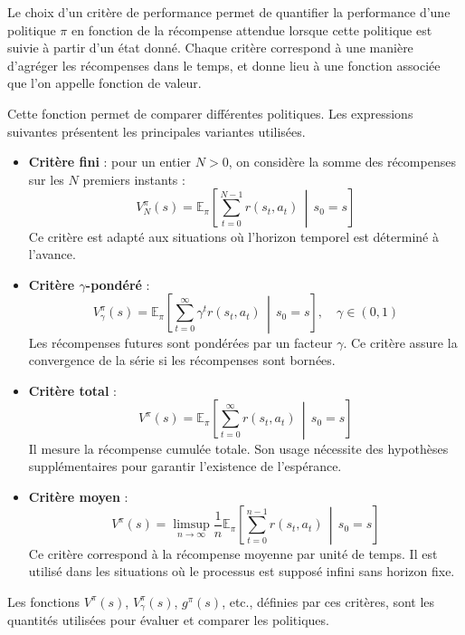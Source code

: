 \documentclass[12pt]{article}
\begin{document}
Le choix d’un critère de performance permet de quantifier la performance d’une politique \(\pi\) en fonction de la récompense attendue lorsque cette politique est suivie à partir d’un état donné. Chaque critère correspond à une manière d’agréger les récompenses dans le temps, et donne lieu à une fonction associée que l’on appelle fonction de valeur.

Cette fonction permet de comparer différentes politiques. Les expressions suivantes présentent les principales variantes utilisées.

\begin{itemize}
    \item \textbf{Critère fini} : pour un entier \(N > 0\), on considère la somme des récompenses sur les \(N\) premiers instants :
    \[
    V^\pi_N(s) = \mathbb{E}_\pi \left[ \sum_{t=0}^{N-1} r(s_t, a_t) \,\middle|\, s_0 = s \right]
    \]
    Ce critère est adapté aux situations où l’horizon temporel est déterminé à l’avance.
\vspace{0.5em}

    \item \textbf{Critère \(\gamma\)-pondéré} :
    \[
    V^\pi_\gamma(s) = \mathbb{E}_\pi \left[ \sum_{t=0}^{\infty} \gamma^t r(s_t, a_t) \,\middle|\, s_0 = s \right], \quad \gamma \in (0,1)
    \]
    Les récompenses futures sont pondérées par un facteur \(\gamma\). Ce critère assure la convergence de la série si les récompenses sont bornées.
\vspace{0.5em}
    \item \textbf{Critère total } :
    \[
    V^\pi(s) = \mathbb{E}_\pi \left[ \sum_{t=0}^{\infty} r(s_t, a_t) \,\middle|\, s_0 = s \right]
    \]
    Il mesure la récompense cumulée totale. Son usage nécessite des hypothèses supplémentaires pour garantir l’existence de l’espérance.
\vspace{0.5em}
    \item \textbf{Critère moyen} :
    \[
    V^\pi(s) = \limsup_{n \to \infty} \frac{1}{n} \mathbb{E}_\pi \left[ \sum_{t=0}^{n-1} r(s_t, a_t) \,\middle|\, s_0 = s \right]
    \]
    Ce critère correspond à la récompense moyenne par unité de temps. Il est utilisé dans les situations où le processus est supposé infini sans horizon fixe.
\end{itemize}

Les fonctions \(V^\pi(s)\), \(V^\pi_\gamma(s)\), \(g^\pi(s)\), etc., définies par ces critères, sont les quantités utilisées pour évaluer et comparer les politiques.
\end{document}
